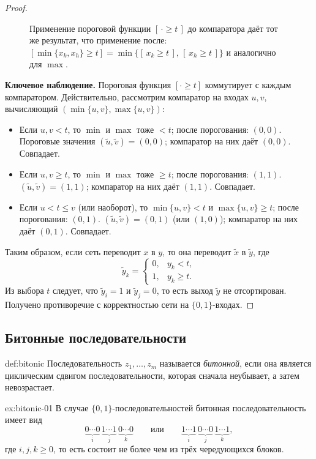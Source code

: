 \begin{proof}
\begin{figure}[h]
\begin{tikzpicture}[>=Stealth, font=\small]
		\end{tikzpicture}
		\caption{
			Применение пороговой функции $[\,\cdot\ge t\,]$ до компаратора
			даёт тот же результат, что применение после:
			$[\min\{x_k,x_h\}\ge t] = \min\{[\,x_k\ge t\,],\,[\,x_h\ge t\,]\}$
			и аналогично для $\max$.}
		\label{fig:zero-one}
	\end{figure}
	
	\textbf{Ключевое наблюдение.} Пороговая функция $[\cdot \ge t]$ коммутирует с каждым компаратором.
	Действительно, рассмотрим компаратор на входах $u,v$, вычисляющий $(\min\{u,v\},\max\{u,v\})$:
	\begin{itemize}
		\item Если $u,v < t$, то $\min$ и $\max$ тоже $<t$; после порогования: $(0,0)$.
		Пороговые значения $(\widetilde u,\widetilde v)=(0,0)$; компаратор на них даёт $(0,0)$. Совпадает.
		\item Если $u,v \ge t$, то $\min$ и $\max$ тоже $\ge t$; после порогования: $(1,1)$.
		$(\widetilde u,\widetilde v)=(1,1)$; компаратор на них даёт $(1,1)$. Совпадает.
		\item Если $u < t \le v$ (или наоборот), то $\min\{u,v\}<t$ и $\max\{u,v\}\ge t$; после порогования: $(0,1)$.
		$(\widetilde u,\widetilde v)=(0,1)$ (или $(1,0)$); компаратор на них даёт $(0,1)$. Совпадает.
	\end{itemize}
	Таким образом, если сеть переводит $x$ в $y$, то она переводит $\widetilde x$ в $\widetilde y$, где
	\[
	\widetilde y_k =
	\begin{cases}
		0, & y_k < t,\\
		1, & y_k \ge t.
	\end{cases}
	\]
	Из выбора $t$ следует, что $\widetilde y_i=1$ и $\widetilde y_j=0$, то есть выход $\widetilde y$ не отсортирован.
	Получено противоречие с корректностью сети на $\{0,1\}$-входах.
\end{proof}

\subsection{Битонные последовательности}

\begin{Definition}{}{def:bitonic}
	Последовательность $z_1,\dots,z_m$ называется \emph{битонной}, если она является циклическим сдвигом последовательности, которая сначала неубывает, а затем невозрастает.
\end{Definition}

\begin{Example}{}{ex:bitonic-01}
	В случае $\{0,1\}$-последовательностей битонная последовательность имеет вид
	\[
	\underbrace{0\cdots 0}_{i}\,\underbrace{1\cdots 1}_{j}\,\underbrace{0\cdots 0}_{k}
	\qquad\text{или}\qquad
	\underbrace{1\cdots 1}_{i}\,\underbrace{0\cdots 0}_{j}\,\underbrace{1\cdots 1}_{k},
	\]
	где $i,j,k\ge 0$, то есть состоит не более чем из трёх чередующихся блоков.
\end{Example}

